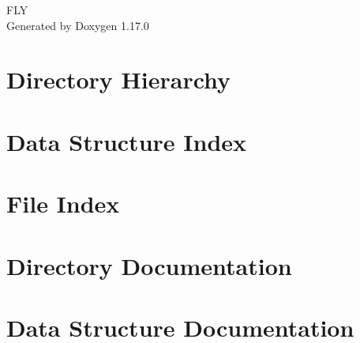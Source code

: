 \documentclass[twoside]{book}
\newcommand{\+}{\discretionary{\mbox{\scriptsize$\hookleftarrow$}}{}{}}
\newcommand{\clearemptydoublepage}{%
    \newpage{\pagestyle{empty}\cleardoublepage}%
  }
\begin{document}
  \raggedbottom
    \hypersetup{pageanchor=false,
                bookmarksnumbered=true,
                pdfencoding=unicode
               }
  \begin{titlepage}
  \vspace*{7cm}
  \begin{center}%
  {\Large FLY}\\
  \vspace*{1cm}
  {\large Generated by Doxygen 1.17.0}\\
  \end{center}
  \end{titlepage}
  \clearemptydoublepage
  \tableofcontents
  \clearemptydoublepage
  \hypersetup{pageanchor=true}
\chapter{Directory Hierarchy}

\chapter{Data Structure Index}

\chapter{File Index}

\chapter{Directory Documentation}









\chapter{Data Structure Documentation}















\end{document}
